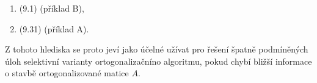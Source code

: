 {\begin{enumerate}[label=\alph*)]
\item {} (9.1)  (příklad B),

\item {} (9.31)  (příklad A).

\end{enumerate}

Z tohoto  hlediska se proto jeví jako účelné užívat pro řešení
špatně podmíněných úloh selektivní varianty ortogonalizačníno
algoritmu, pokud chybí bližší informace o stavbě
ortogonalizované matice $A$.



}%
